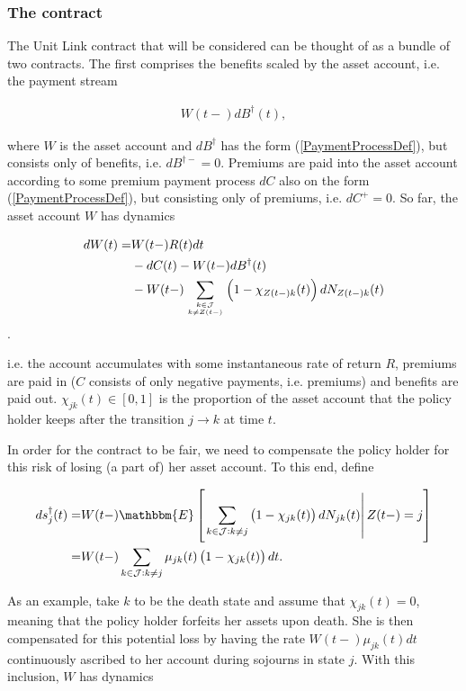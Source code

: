 \documentclass{book}
\newcommand{\1}[1]{\mathbbm{1}_{\left\lbrace #1 \right\rbrace}}
\newcommand{\econd}[2][def]{\mathbbm{E} \left[ \left. #1 \right| #2 \right]}
\theoremstyle{break}
\theoremstyle{remark}
\numberwithin{equation}{section}
\begin{document}
\subsubsection{The contract}

The Unit Link contract that will be considered can be thought of as a bundle of two contracts. The first comprises the benefits scaled by the asset account, i.e. the payment stream

\begin{align*}
	W(t-)dB^{\dagger}(t),
\end{align*}

where $W$ is the asset account and $dB^{\dagger}$ has the form (\ref{PaymentProcessDef}), but consists only of benefits, i.e. $dB^{\dagger-}=0$. Premiums are paid into the asset account according to some premium payment process $dC$ also on the form (\ref{PaymentProcessDef}), but consisting only of premiums, i.e. $dC^{+}=0$. So far, the asset account $W$ has dynamics

\begin{align*}
	dW(t) =& W(t-) R(t) dt \\
	&- dC(t) - W(t-) dB^\dagger(t) \\
	&- W(t-) \sum_{k \in \mathcal{J} \atop k \neq Z(t-)} \left( 1 - \chi_{Z(t-)k}(t) \right) dN_{Z(t-)k}(t)
\end{align*}.

i.e. the account accumulates with some instantaneous rate of return $R$, premiums are paid in ($C$ consists of only negative payments, i.e. premiums) and benefits are paid out. $\chi_{jk}(t) \in [0,1]$ is the proportion of the asset account that the policy holder keeps after the transition $j \to k$ at time $t$.

In order for the contract to be fair, we need to compensate the policy holder for this risk of losing (a part of) her asset account. To this end, define

\begin{align*}
	ds_j^\dagger(t) =& W(t-) \econd[\sum_{k \in \mathcal{J}: k \neq j} \left( 1 - \chi_{jk}(t) \right) dN_{jk}(t)]{Z(t-)=j} \\
	=& W(t-) \sum_{k \in \mathcal{J}: k \neq j} \mu_{jk}(t) \left( 1 - \chi_{jk}(t) \right) dt.
\end{align*}

As an example, take $k$ to be the death state and assume that $\chi_{jk}(t)=0$, meaning that the policy holder forfeits her assets upon death. She is then compensated for this potential loss by having the rate $W(t-)\mu_{jk}(t)dt$ continuously ascribed to her account during sojourns in state $j$. With this inclusion, $W$ has dynamics
\end{document}
